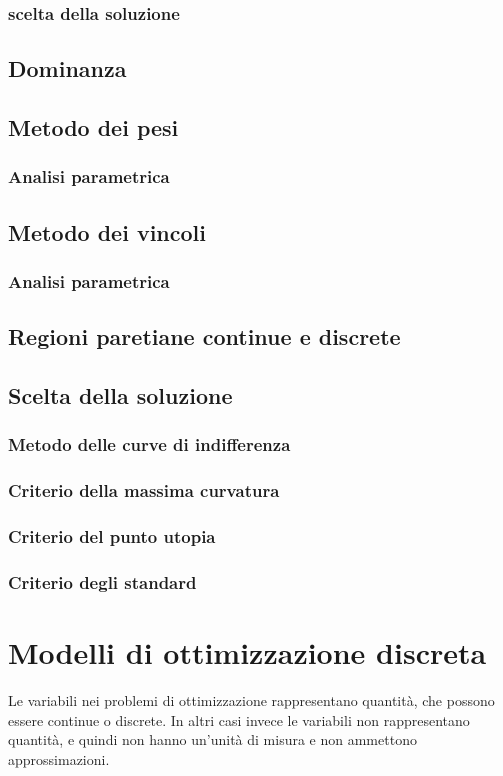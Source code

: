 \documentclass[11pt, oneside]{article}   	%
\begin{document}
\subsubsection{scelta della soluzione}
\subsection{Dominanza}
\subsection{Metodo dei pesi}
\subsubsection{Analisi parametrica}
\subsection{Metodo dei vincoli}
\subsubsection{Analisi parametrica}
\subsection{Regioni paretiane continue e discrete}
\subsection{Scelta della soluzione}
\subsubsection{Metodo delle curve di indifferenza}
\subsubsection{Criterio della massima curvatura}
\subsubsection{Criterio del punto utopia}
\subsubsection{Criterio degli standard}

\section{Modelli di ottimizzazione discreta}
Le variabili nei problemi di ottimizzazione rappresentano quantità, che possono essere continue o discrete. In altri casi invece le variabili non rappresentano quantità, e quindi non hanno un'unità di misura e non ammettono approssimazioni.
\end{document}
